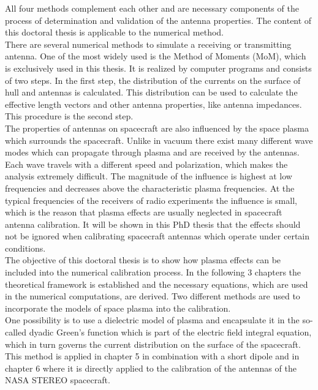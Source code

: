 \documentclass[a4paper,11pt]{thesis}
\begin{document}
All four methods complement each other and are necessary components of the process of determination and validation of the antenna properties. The content of this doctoral thesis is applicable to the numerical method.\\

There are several numerical methods to simulate a receiving or transmitting antenna. One of the most widely used is the Method of Moments
(MoM), which is exclusively used in this thesis. It is realized by computer programs and consists of two steps. In the first step, the distribution of the currents on the surface of hull and antennas is calculated. This distribution can be used to calculate the effective length vectors and other antenna properties, like antenna impedances. This procedure is the second step.\\

The properties of antennas on spacecraft are also influenced by the space plasma which surrounds the spacecraft. Unlike in vacuum there exist many different wave modes which can propagate through plasma and are received by the antennas. Each wave travels with a different speed and polarization, which makes the analysis extremely difficult. The magnitude of the influence is highest at low frequencies and decreases above the characteristic plasma frequencies. At the typical frequencies of the receivers of radio experiments the influence is small, which is the reason that plasma effects are usually neglected in spacecraft antenna calibration. It will be shown in this PhD thesis that the effects should not be ignored when calibrating spacecraft antennas which operate under certain conditions.\\

The objective of this doctoral thesis is to show how plasma effects can be included into the numerical calibration process. In the following 3 chapters the theoretical framework is established and the necessary equations, which are used in the numerical computations, are derived. Two different methods are used to incorporate the models of space plasma into the calibration.\\

One possibility is to use a dielectric model of plasma and encapsulate it in the so-called dyadic Green's function which is part of the electric field integral equation, which in turn governs the current distribution on the surface of the spacecraft. This method is applied in chapter 5 in combination with a short dipole and in chapter 6 where it is directly applied to the calibration of the antennas of the NASA STEREO spacecraft.\\
\end{document}
